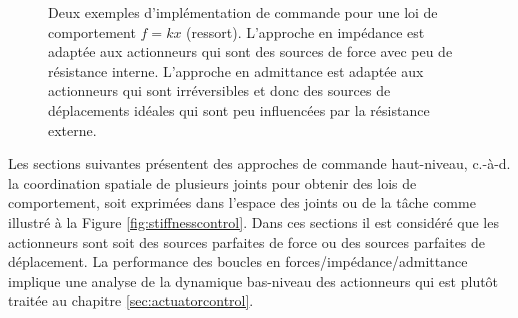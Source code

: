 \begin{figure}[H]
	\vspace{-10pt}
	\centering
	\hspace{5pt}
	\caption{Deux exemples d'implémentation de commande pour une loi de comportement $f=kx$ (ressort). L'approche en impédance est adaptée aux actionneurs qui sont des sources de force avec peu de résistance interne. L'approche en admittance est adaptée aux actionneurs qui sont irréversibles et donc des sources de déplacements idéales qui sont peu influencées par la résistance externe.}
	\label{fig:impedanceadmitancesex}
\end{figure}

Les sections suivantes présentent des approches de commande haut-niveau, c.-à-d. la coordination spatiale de plusieurs joints pour obtenir des lois de comportement, soit exprimées dans l'espace des joints ou de la tâche comme illustré à la Figure \ref{fig:stiffnesscontrol}. Dans ces sections il est considéré que les actionneurs sont soit des sources parfaites de force ou des sources parfaites de déplacement. La performance des boucles en forces/impédance/admittance implique une analyse de la dynamique bas-niveau des actionneurs qui est plutôt traitée au chapitre \ref{sec:actuatorcontrol}.


